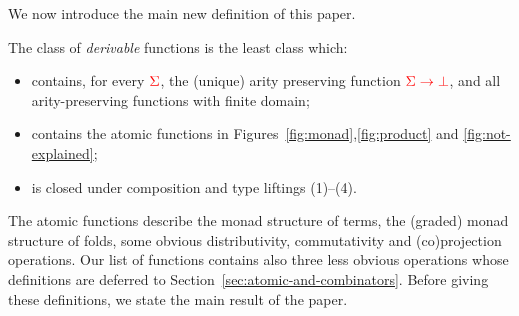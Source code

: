 We now introduce the main new definition of this paper.

\begin{definition}
    The class of \emph{derivable} functions is the least class which:
    \begin{itemize}
    \item contains, for every ${\color{red}{\Sigma}}$, the (unique) arity preserving function ${\color{red}{\Sigma \to \bot}}$, and all arity-preserving functions with finite domain;
        \item contains the atomic functions in Figures~\ref{fig:monad},\ref{fig:product} and \ref{fig:not-explained};
        \item is closed under composition and type liftings (1)--(4).
    \end{itemize}
\end{definition}

%

The atomic functions describe the monad structure of terms, the (graded) monad structure of folds, some obvious distributivity, commutativity and (co)projection operations.  Our list of functions contains also three less obvious operations whose definitions are  deferred to Section~\ref{sec:atomic-and-combinators}. Before giving these definitions, we state the main result of the paper. 


